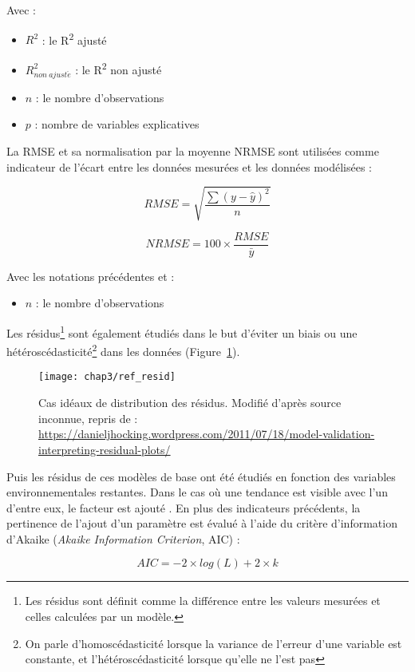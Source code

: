 Avec : 
\begin{itemize}
\item $R^{2}$ : le R\textsuperscript{2} ajusté
\item $R^{2}_{non~ajust\acute{e}}$ : le R\textsuperscript{2} non ajusté
\item $n$ : le nombre d'observations
\item $p$ : nombre de variables explicatives
\end{itemize}

La RMSE et sa normalisation par la moyenne NRMSE sont utilisées comme indicateur de l'écart entre les données mesurées et les données modélisées :

$$ RMSE = \sqrt{\frac{\sum(y - \hat{y})^2}{n}} $$

$$ NRMSE = 100 \times \frac{RMSE}{\bar{y}} $$

Avec les notations précédentes et : 
\begin{itemize}
\item $n$ : le nombre d'observations
\end{itemize}
Les résidus\footnote{Les résidus sont définit comme la différence entre les valeurs mesurées et celles calculées par un modèle.} sont également étudiés dans le but d'éviter un biais ou une hétéroscédasticité\footnote{On parle d'homoscédasticité lorsque la variance de l'erreur d'une variable est constante, et l'hétéroscédasticité lorsque qu'elle ne l'est pas} dans les données (Figure~\ref{fig:ref_resid}).

\begin{figure}[!htb]
\centering
\texttt{[image: chap3/ref\_resid]}
\caption{Cas idéaux de distribution des résidus. Modifié d'après source inconnue, repris de : \url{https://danieljhocking.wordpress.com/2011/07/18/model-validation-interpreting-residual-plots/}}
\label{fig:ref_resid}
\end{figure}

Puis les résidus de ces modèles de base ont été étudiés en fonction des variables environnementales restantes.
Dans le cas où une tendance est visible avec l'un d'entre eux, le facteur est ajouté \citep{bortoluzzi2006a}.
En plus des indicateurs précédents, la pertinence de l'ajout d'un paramètre est évalué à l'aide du  critère d'information d'Akaike (\textit{Akaike Information Criterion}, AIC) \citep{akaike1974,burnham2002} :

$$ AIC = -2 \times log(L) + 2\times k $$ 

